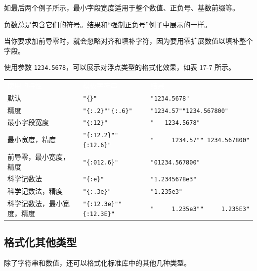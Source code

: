如最后两个例子所示，最小字段宽度适用于整个数值、正负号、基数前缀等。

负数总是包含它们的符号。结果和“强制正负号”例子中展示的一样。

当你要求加前导零时，就会忽略对齐和填补字符，因为要用零扩展数值以填补整个字段。

使用参数 \texttt{1234.5678}，可以展示对浮点类型的格式化效果，如表 17-7 所示。


\myTableBegin
\begin{tabularx}{\textwidth}{@{}>{\hsize=0.561\hsize\raggedright\arraybackslash}X>{\hsize=1.187\hsize\raggedright\arraybackslash}X>{\hsize=1.251\hsize\raggedright\arraybackslash}X@{}}
\rowcolor{tabhead}\textcolor{white}{使用的特性} & \textcolor{white}{模板字符串} & \textcolor{white}{结果} \\
默认 & \texttt{"\{\}"} & \texttt{"1234.5678"} \\
精度 & \texttt{"\{:.2\}"}\newline{}\texttt{"\{:.6\}"} & \texttt{"1234.57"}\newline{}\texttt{"1234.567800"} \\
最小字段宽度 & \texttt{"\{:12\}"} & \texttt{"   1234.5678"} \\
最小宽度，精度 & \texttt{"\{:12.2\}"}\newline{}\texttt{"\{:12.6\}"} & \texttt{"     1234.57"}\newline{}\texttt{" 1234.567800"} \\
前导零，最小宽度，精度 & \texttt{"\{:012.6\}"} & \texttt{"01234.567800"} \\
科学记数法 & \texttt{"\{:e\}"} & \texttt{"1.2345678e3"} \\
科学记数法，精度 & \texttt{"\{:.3e\}"} & \texttt{"1.235e3"} \\
科学记数法，最小宽度，精度 & \texttt{"\{:12.3e\}"}\newline{}\texttt{"\{:12.3E\}"} & \texttt{"     1.235e3"}\newline{}\texttt{"     1.235E3"} \\
\end{tabularx}
\myTableEnd

\subsection{格式化其他类型}

除了字符串和数值，还可以格式化标准库中的其他几种类型。

